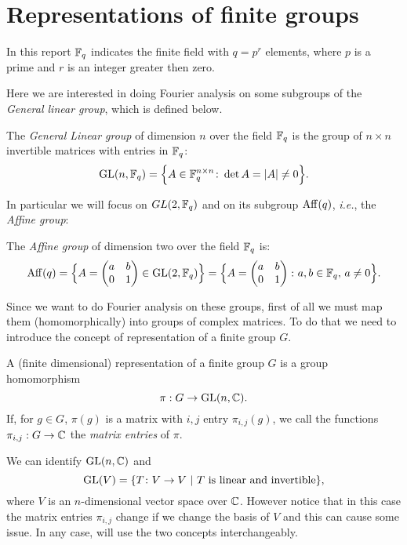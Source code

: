 \section{Representations of finite groups}
In this report ${\mathbb F}_q$ indicates the finite field with $q=p^r$ elements, where $p$ is a prime and $r$ is an integer greater then zero.

Here we are interested in doing Fourier analysis on some subgroups of the \emph{General linear group}, which is defined below. 
\begin{defn}
The {\it General Linear group} of dimension $n$ over the field ${\mathbb F}_q$ is the group of $n\times n$ invertible matrices with entries in ${\mathbb F}_q$:
\begin{equation*}
\operatorname{GL}(n,{\mathbb F}_q)=\Big\{ A \in {\mathbb F}_q^{n \times n} \colon \det A = \lvert A\rvert\neq 0 \Big\}.
\end{equation*}	
\end{defn}
In particular we will focus on $GL(2,{\mathbb F}_q)$ and on its subgroup $\operatorname{Aff}(q)$, \emph{i.e.}, the \emph{Affine group}:
\begin{defn}
The {\emph{ Affine group}} of dimension two over the field ${\mathbb F}_q$ is:
\begin{equation}
\label{def:aff_group}
\operatorname{Aff} (q)=\Big\{ A=\begin{pmatrix} a & b \\ 0 & 1 \end{pmatrix}\in \operatorname{GL}(2,{\mathbb F}_q) \Big\}=\Big\{ A=\begin{pmatrix} a & b \\ 0 & 1 \end{pmatrix} \colon a,b \in {\mathbb F}_q, \, a \neq 0 \Big \}.
\end{equation}
\end{defn}
Since we want to do Fourier analysis on these groups, first of all we must map them (homomorphically) into groups of complex matrices. To do that we need to introduce the concept of representation of a finite group $G$.

\begin{defn}
A (finite dimensional) representation of a finite group $G$ is a group homomorphism
\[
\pi:  G \rightarrow \operatorname{GL}(n,{\mathbb C}).
\]
If, for $g\in G$, $\pi(g)$ is a matrix with $i,j$ entry $\pi_{i,j}(g)$, we call the functions $\pi_{i,j} : G \rightarrow {\mathbb C}$ the \emph{matrix entries} of $\pi$.
\end{defn}
\begin{rem}
We can identify $\operatorname{GL}(n,{\mathbb C})$ and
\[
\operatorname{GL}(V)=\{T\colon V\rightarrow V \ | \  T \text{ is linear and invertible}\},
\]
where $V$ is an $n$-dimensional vector space over ${\mathbb C}$. However notice that in this case the matrix entries $\pi_{i,j}$ change if we change the basis of $V$ and this can cause some issue. In any case, will use the two concepts interchangeably.
\end{rem}

